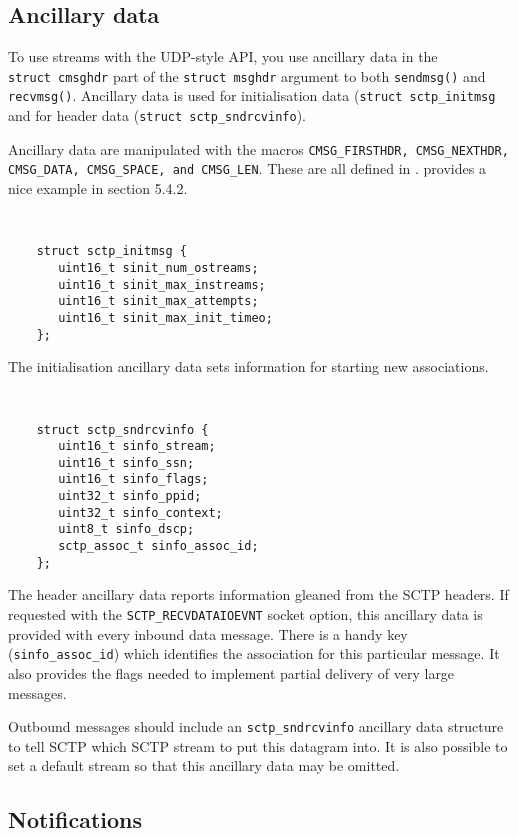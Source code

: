 \documentclass[twocolumn]{article}
\begin{document}
\subsection{Ancillary data}

To use streams with the UDP-style API, you use ancillary data in the
\texttt{struct~cmsghdr} part of the \texttt{struct~msghdr} argument to
both \texttt{sendmsg()} and \texttt{recvmsg()}.  Ancillary data is
used for initialisation data (\texttt{struct~sctp\_initmsg} and for
header data (\texttt{struct~sctp\_sndrcvinfo}).

Ancillary data are manipulated with the macros \texttt{CMSG\_FIRSTHDR,
CMSG\_NEXTHDR, CMSG\_DATA, CMSG\_SPACE, \textnormal{and} CMSG\_LEN}.
These are all defined in \cite{rfc2292}.  \cite{api} provides a nice
example in section 5.4.2.

{\tt \small
\begin{verbatim}
    struct sctp_initmsg {
       uint16_t sinit_num_ostreams;
       uint16_t sinit_max_instreams;
       uint16_t sinit_max_attempts;
       uint16_t sinit_max_init_timeo;
    };
\end{verbatim}
}

The initialisation ancillary data sets information for starting 
new associations.

{\tt \small
\begin{verbatim}
    struct sctp_sndrcvinfo {
       uint16_t sinfo_stream;
       uint16_t sinfo_ssn;
       uint16_t sinfo_flags;
       uint32_t sinfo_ppid;
       uint32_t sinfo_context;
       uint8_t sinfo_dscp;
       sctp_assoc_t sinfo_assoc_id;
    };
\end{verbatim}
}

The header ancillary data reports information gleaned from the SCTP
headers.  If requested with the \texttt{SCTP\_RECVDATAIOEVNT} socket
option, this ancillary data is provided with every inbound data
message.  There is a handy key (\texttt{sinfo\_assoc\_id}) which
identifies the association for this particular message.  It also
provides the flags needed to implement partial delivery of very large
messages.

Outbound messages should include an \texttt{sctp\_sndrcvinfo} ancillary 
data structure to tell SCTP which SCTP stream to put this datagram
into.  It is also possible to set a default stream so that this
ancillary data may be omitted.

\subsection{Notifications}
\end{document}
